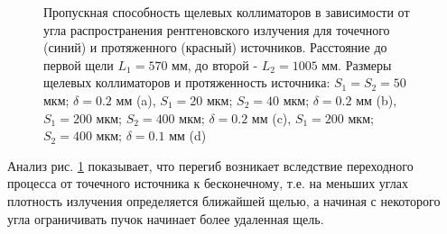\begin{figure}[H]
 \centering
 \hfill
 \hfill
 \hfill
 \caption{Пропускная способность щелевых коллиматоров в зависимости от угла распространения
 рентгеновского излучения для точечного (синий) и протяженного (красный) источников.
 Расстояние до первой щели $L_1 = 570$ мм, до второй - $L_2 = 1005 $ мм.
 Размеры щелевых коллиматоров и протяженность источника:
   $S_1 = S_2 = 50$ мкм; $\delta = 0.2$ мм (a),
   $S_1 = 20$ мкм; $S_2 = 40$ мкм; $\delta = 0.2$ мм (b),
   $S_1 = 200$ мкм; $S_2 = 400$ мкм; $\delta = 0.2$ мм (c),
   $S_1 = 200$ мкм; $S_2 = 400$ мкм; $\delta = 0.1$ мм (d)}
 \label{ris:calc_slits_ability_res}
\end{figure}

Анализ рис. \ref{ris:calc_slits_ability_res} показывает, что перегиб  возникает вследствие переходного
процесса от точечного источника к бесконечному, т.е. на меньших углах плотность
излучения определяется ближайшей щелью, а начиная с некоторого угла ограничивать пучок начинает
более удаленная щель.
